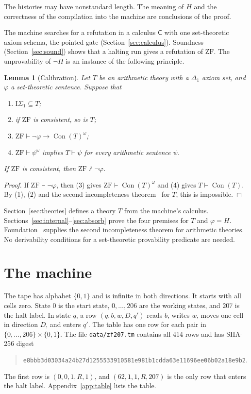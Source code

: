 \documentclass[11pt,letterpaper]{article}
\newtheorem{lemma}[theorem]{Lemma}
\newcommand{\ZF}{\mathrm{ZF}}
\newcommand{\ISig}{\mathrm{I}\Sigma_1}
\newcommand{\Con}{\operatorname{Con}}
\newcommand{\Cc}{\mathsf{C}}
\newcommand{\file}[1]{\texttt{\nolinkurl{#1}}}
\begin{document}
The histories may have nonstandard length. The meaning of $H$ and the
correctness of the compilation into the machine are conclusions of the
proof.

The machine searches for a refutation in a calculus $\Cc$ with
one set-theoretic axiom schema, the pointed gate
(Section~\ref{sec:calculus}). Soundness (Section~\ref{sec:sound}) shows
that a halting run gives a refutation of $\ZF$. The unprovability of
$\neg H$ is an instance of the following principle.

\begin{lemma}[Calibration]\label{lem:calib}
Let $T$ be an arithmetic theory with a $\Delta_1$ axiom set, and $\varphi$ a
set-theoretic sentence. Suppose that
\begin{enumerate}
\item $\ISig\subseteq T$;
\item if $\ZF$ is consistent, so is $T$;
\item $\ZF\vdash\neg\varphi\to\Con(T)^\omega$;
\item $\ZF\vdash\psi^\omega$ implies $T\vdash\psi$ for every arithmetic
  sentence $\psi$.
\end{enumerate}
If $\ZF$ is consistent, then $\ZF\nvdash\neg\varphi$.
\end{lemma}

\begin{proof}
If $\ZF\vdash\neg\varphi$, then (3) gives $\ZF\vdash\Con(T)^\omega$ and (4)
gives $T\vdash\Con(T)$. By (1), (2) and the second incompleteness
theorem~\cite{goedel} for $T$, this is impossible.
\end{proof}

Section~\ref{sec:theories} defines a theory $T$ from the machine's
calculus. Sections~\ref{sec:internal}--\ref{sec:absorb} prove the four
premises for $T$ and $\varphi=H$. Foundation~\cite{foundation} supplies
the second incompleteness theorem for arithmetic theories. No
derivability conditions for a set-theoretic provability predicate are
needed.

\section{The machine}\label{sec:machine}

The tape has alphabet $\{0,1\}$ and is infinite in both directions. It
starts with all cells zero. State $0$ is the start state, $0,\ldots,206$
are the working states, and $207$ is the halt label. In state $q$, a row
$(q,b,w,D,q')$ reads $b$, writes $w$, moves one cell in direction $D$, and
enters $q'$. The table has one row for each pair in
$\{0,\ldots,206\}\times\{0,1\}$. The file \file{data/zf207.tm} contains
all 414 rows and has SHA-256 digest
\begin{quote}\small
\nolinkurl{e8bbb3d03034a24b27d1255533910581e981b1cdda63e11696ee06b02a18e9b2}.
\end{quote}
The first row is $(0,0,1,R,1)$, and $(62,1,1,R,207)$ is the only row that
enters the halt label. Appendix~\ref{app:table} lists the table.
\end{document}
